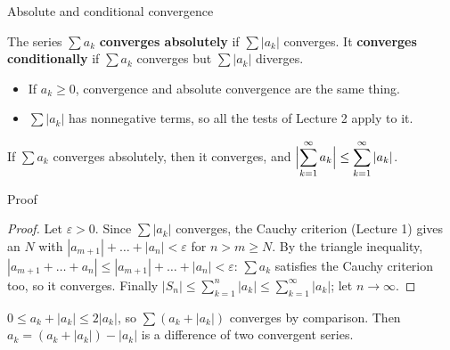 \documentclass[10pt]{wosm-slides}
\begin{document}
\begin{frame}{Absolute and conditional convergence}
  \begin{definition}
    The series $\sum a_k$ \textbf{converges absolutely} if $\sum |a_k|$ converges.
    It \textbf{converges conditionally} if $\sum a_k$ converges but $\sum |a_k|$ diverges.
  \end{definition}
  \begin{itemize}
    \item If $a_k \ge 0$, convergence and absolute convergence are the same thing.
    \item $\sum |a_k|$ has nonnegative terms, so all the tests of Lecture 2 apply to it.
  \end{itemize}
  \pause
  \begin{theorem}
    If $\sum a_k$ converges absolutely, then it converges, and
    $\displaystyle\Bigl|\sum_{k=1}^\infty a_k\Bigr| \le \sum_{k=1}^\infty |a_k|$.
  \end{theorem}
\end{frame}

\begin{frame}{Proof}
  \begin{proof}
    Let $\varepsilon > 0$. Since $\sum |a_k|$ converges, the Cauchy criterion
    (Lecture 1) gives an $N$ with $|a_{m+1}| + \dots + |a_n| < \varepsilon$ for
    $n > m \ge N$. By the triangle inequality,
    $|a_{m+1} + \dots + a_n| \le |a_{m+1}| + \dots + |a_n| < \varepsilon$:
    $\sum a_k$ satisfies the Cauchy criterion too, so it converges.
    Finally $|S_n| \le \sum_{k=1}^{n} |a_k| \le \sum_{k=1}^\infty |a_k|$; let $n \to \infty$.
  \end{proof}
  \pause
  \begin{remark}
    $0 \le a_k + |a_k| \le 2|a_k|$, so $\sum (a_k + |a_k|)$ converges by comparison.
    Then $a_k = (a_k + |a_k|) - |a_k|$ is a difference of two convergent series.
  \end{remark}
\end{frame}
\end{document}
